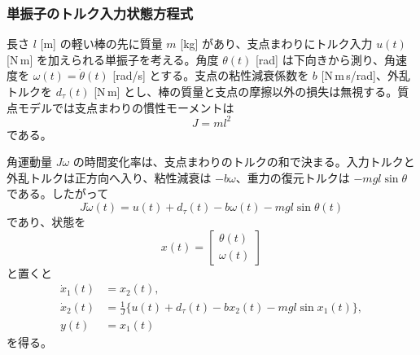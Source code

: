 \subsubsection{単振子のトルク入力状態方程式}

長さ $l$ [m] の軽い棒の先に質量 $m$ [kg] があり、支点まわりにトルク入力 $u(t)$ [N\,m] を加えられる単振子を考える。角度 $\theta(t)$ [rad] は下向きから測り、角速度を $\omega(t)=\dot{\theta}(t)$ [rad/s] とする。支点の粘性減衰係数を $b$ [N\,m\,s/rad]、外乱トルクを $d_\tau(t)$ [N\,m] とし、棒の質量と支点の摩擦以外の損失は無視する。質点モデルでは支点まわりの慣性モーメントは
\begin{equation}
  J=ml^2
\end{equation}
である。

角運動量 $J\omega$ の時間変化率は、支点まわりのトルクの和で決まる。入力トルクと外乱トルクは正方向へ入り、粘性減衰は $-b\omega$、重力の復元トルクは $-mgl\sin\theta$ である。したがって
\begin{equation}
  J\dot{\omega}(t)
  =u(t)+d_\tau(t)-b\omega(t)-mgl\sin\theta(t)
\end{equation}
であり、状態を
\begin{equation}
  x(t)=\begin{bmatrix}\theta(t)\\ \omega(t)\end{bmatrix}
\end{equation}
と置くと
\begin{align}
  \dot{x}_1(t)&=x_2(t),\\
  \dot{x}_2(t)&=\frac{1}{J}\{u(t)+d_\tau(t)-b x_2(t)-mgl\sin x_1(t)\},\label{eq:pendulum-state}\\
  y(t)&=x_1(t)
\end{align}
を得る。

